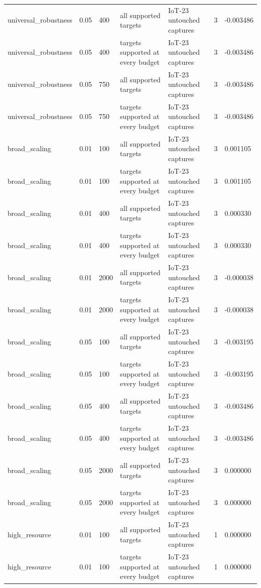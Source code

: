 \begin{tabular}{lllllll}
universal\_robustness & 0.05 & 400 & all supported targets & IoT-23 untouched captures & 3 & -0.003486 \\
universal\_robustness & 0.05 & 400 & targets supported at every budget & IoT-23 untouched captures & 3 & -0.003486 \\
universal\_robustness & 0.05 & 750 & all supported targets & IoT-23 untouched captures & 3 & -0.003486 \\
universal\_robustness & 0.05 & 750 & targets supported at every budget & IoT-23 untouched captures & 3 & -0.003486 \\
broad\_scaling & 0.01 & 100 & all supported targets & IoT-23 untouched captures & 3 & 0.001105 \\
broad\_scaling & 0.01 & 100 & targets supported at every budget & IoT-23 untouched captures & 3 & 0.001105 \\
broad\_scaling & 0.01 & 400 & all supported targets & IoT-23 untouched captures & 3 & 0.000330 \\
broad\_scaling & 0.01 & 400 & targets supported at every budget & IoT-23 untouched captures & 3 & 0.000330 \\
broad\_scaling & 0.01 & 2000 & all supported targets & IoT-23 untouched captures & 3 & -0.000038 \\
broad\_scaling & 0.01 & 2000 & targets supported at every budget & IoT-23 untouched captures & 3 & -0.000038 \\
broad\_scaling & 0.05 & 100 & all supported targets & IoT-23 untouched captures & 3 & -0.003195 \\
broad\_scaling & 0.05 & 100 & targets supported at every budget & IoT-23 untouched captures & 3 & -0.003195 \\
broad\_scaling & 0.05 & 400 & all supported targets & IoT-23 untouched captures & 3 & -0.003486 \\
broad\_scaling & 0.05 & 400 & targets supported at every budget & IoT-23 untouched captures & 3 & -0.003486 \\
broad\_scaling & 0.05 & 2000 & all supported targets & IoT-23 untouched captures & 3 & 0.000000 \\
broad\_scaling & 0.05 & 2000 & targets supported at every budget & IoT-23 untouched captures & 3 & 0.000000 \\
high\_resource & 0.01 & 100 & all supported targets & IoT-23 untouched captures & 1 & 0.000000 \\
high\_resource & 0.01 & 100 & targets supported at every budget & IoT-23 untouched captures & 1 & 0.000000 \\

\end{tabular}
